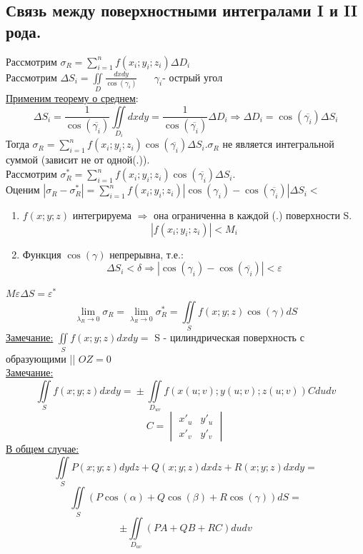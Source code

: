 \documentclass[12pt]{article}
\let\oldiint\iint
\let\oldsum\sum
\let\oldlim\lim
\renewcommand{\iint}{\oldiint\limits}
\renewcommand{\sum}{\oldsum\limits}
\renewcommand{\lim}{\oldlim\limits}
\begin{document}
  \subsection{Связь между поверхностными интегралами I и II рода.}
  Рассмотрим $\sigma_R=\sum_{i=1}^{n} f(x_i;y_i;z_i)\Delta D_i$\\
  Рассмотрим $\Delta S_i = \iint_D \frac{dxdy}{\cos(\gamma_i)} \hspace{20pt} \gamma_i$- острый угол\\
  \underline{Применим \hyperref[th:8.12.1]{теорему о среднем}}:
  \[\Delta S_i = \frac{1}{\cos(\overline{\gamma_i})}\iint_{D_i} dxdy= \frac{1}{\cos(\overline{\gamma_i})}\Delta D_i
  \Rightarrow \Delta D_i = \cos(\overline{\gamma_i})\Delta S_i\]
  Тогда $\sigma_R=\sum_{i=1}^{n}f(x_i;y_i;z_i)\cos(\overline{\gamma_i})\Delta S_i.\sigma_R$ не является интегральной суммой
  (зависит не от одной(.)).\\
  Рассмотрим $\sigma_R^*=\sum_{i=1}^{n}f(x_i;y_i;z_i)\cos(\overline{\gamma_i})\Delta S_i$. \\
  Оценим $|\sigma_R-\sigma_R^*|= \sum_{i=1}^{n}f(x_i;y_i;z_i)|\cos(\gamma_i)-\cos(\overline{\gamma_i})|\Delta S_i \boxed{<}$
  \begin{enumerate}
    \item $f(x;y;z)$ интегрируема $\Rightarrow$ она ограниченна в каждой (.) поверхности S.
    \[|f(x_i;y_i;z_i)|<M_i\]
    \item Функция $\cos(\gamma)$ непрерывна, т.е.:
    \[\Delta S_i < \delta \Rightarrow |\cos(\gamma_i)-\cos(\overline{\gamma_i})|<\varepsilon\]
  \end{enumerate}
  \boxed{<} $M\varepsilon \Delta S =\varepsilon^*$
  \[\lim_{\lambda_R \to 0} \sigma_R = \lim_{\lambda_R \to 0} \sigma_R^* = \iint_S f(x;y;z)\cos(\gamma)dS\]
  \underline{Замечание:} $\iint_{S} f(x;y;z)dxdy \boxed{=} $ S - цилиндрическая поверхность с образующими || $OZ \boxed{=} 0$\\
  \underline{Замечание:} \[\iint_{S} f(x;y;z)dxdy \boxed{=} \pm \iint_{D_{uv}} f(x(u;v);y(u;v);z(u;v))C dudv\] 
  \[C=\begin{vmatrix}
    x'_u & y'_u\\
    x'_v & y'_v
  \end{vmatrix}\]
  \underline{В общем случае:}
  \[\iint_S P(x;y;z)dydz+Q(x;y;z)dxdz+R(x;y;z)dxdy=\]\[\iint_S (P\cos(\alpha)+Q\cos(\beta)+R\cos(\gamma))dS=\]
  \[\pm \iint_{D_{uv}}(PA+QB+RC)dudv\]
\end{document}

